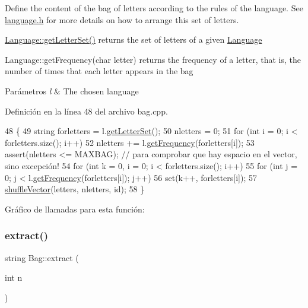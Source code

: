 Define the content of the bag of letters according to the rules of the language. See \hyperlink{language_8h}{language.\+h} for more details on how to arrange this set of letters. 


\begin{DoxyItemize}
\item \hyperlink{classLanguage_ad72e0fe4a285a849d217a1b9251c79f1}{Language\+::get\+Letter\+Set()} returns the set of letters of a given \hyperlink{classLanguage}{Language}
\item Language\+::get\+Frequency(char letter) returns the frequency of a letter, that is, the number of times that each letter appears in the bag 
\begin{DoxyParams}{Parámetros}
{\em l} & The chosen language \\
\hline
\end{DoxyParams}

\end{DoxyItemize}

Definición en la línea 48 del archivo bag.\+cpp.


\begin{DoxyCode}
48                                   \{
49     \textcolor{keywordtype}{string} forletters = l.\hyperlink{classLanguage_ad72e0fe4a285a849d217a1b9251c79f1}{getLetterSet}();
50     nletters = 0;
51     \textcolor{keywordflow}{for} (\textcolor{keywordtype}{int} i = 0; i < forletters.size(); i++)
52         nletters += l.\hyperlink{classLanguage_ac727ac60a054ecd36e526fe93de8fc7f}{getFrequency}(forletters[i]);  
53     assert(nletters <= MAXBAG); \textcolor{comment}{// para comprobar que hay espacio en el vector, sino excepción!}
54     \textcolor{keywordflow}{for} (\textcolor{keywordtype}{int} k = 0, i = 0; i < forletters.size(); i++)
55         \textcolor{keywordflow}{for} (\textcolor{keywordtype}{int} j = 0; j < l.\hyperlink{classLanguage_ac727ac60a054ecd36e526fe93de8fc7f}{getFrequency}(forletters[i]); j++)
56             \textcolor{keyword}{set}(k++, forletters[i]);
57     \hyperlink{bag_8cpp_a93c24c436157bf4f753bd36d1e1d2e4a}{shuffleVector}(letters, nletters, \textcolor{keywordtype}{id});
58 \}
\end{DoxyCode}
Gráfico de llamadas para esta función\+:
\mbox{\label{classBag_ac75abe2b7626e50109a1add3382978af}} 
\subsubsection{\texorpdfstring{extract()}{extract()}}
{\footnotesize\ttfamily string Bag\+::extract (\begin{DoxyParamCaption}\item[{int}]{n }\end{DoxyParamCaption})}



